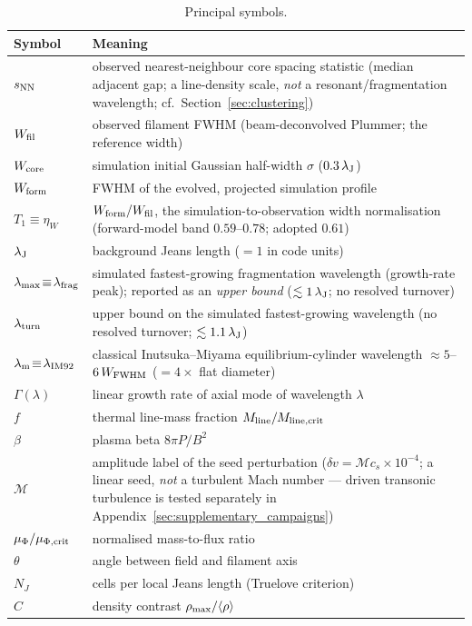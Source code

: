 \documentclass[usenatbib,twoside,twocolumn]{mnras}
\begin{document}
\begin{table}
\caption{Principal symbols.}
\label{tab:symbols}
\footnotesize
\setlength{\tabcolsep}{4pt}
\begin{tabular}{lp{6.1cm}}
\toprule
Symbol & Meaning \\
\midrule
$s_{\rm NN}$ & observed nearest-neighbour core spacing statistic (median adjacent gap; a line-density scale, \emph{not} a resonant/fragmentation wavelength; cf.\ Section~\ref{sec:clustering}) \\
$W_{\rm fil}$ & observed filament FWHM (beam-deconvolved Plummer; the reference width) \\
$W_{\rm core}$ & simulation initial Gaussian half-width $\sigma$ ($0.3\,\lambda_{\rm J}$) \\
$W_{\rm form}$ & FWHM of the evolved, projected simulation profile \\
$T_1\!\equiv\!\eta_W$ & $W_{\rm form}/W_{\rm fil}$, the simulation-to-observation width normalisation (forward-model band $0.59$--$0.78$; adopted $0.61$) \\
$\lambda_{\rm J}$ & background Jeans length ($=1$ in code units) \\
$\lambda_{\rm max}\!\equiv\!\lambda_{\rm frag}$ & simulated fastest-growing fragmentation wavelength (growth-rate peak); reported as an \emph{upper bound} ($\lesssim1\,\lambda_{\rm J}$; no resolved turnover) \\
$\lambda_{\rm turn}$ & upper bound on the simulated fastest-growing wavelength (no resolved turnover; $\lesssim1.1\,\lambda_{\rm J}$) \\
$\lambda_{\rm m}\!\equiv\!\lambda_{\rm IM92}$ & classical Inutsuka--Miyama equilibrium-cylinder wavelength $\approx5$--$6\,W_{\rm FWHM}$ ($=4\times$ flat diameter) \\
$\Gamma(\lambda)$ & linear growth rate of axial mode of wavelength $\lambda$ \\
$f$ & thermal line-mass fraction $M_{\rm line}/M_{\rm line,crit}$ \\
$\beta$ & plasma beta $8\pi P/B^2$ \\
$\mathcal{M}$ & amplitude label of the seed perturbation ($\delta v=\mathcal{M}c_s\times10^{-4}$; a linear seed, \emph{not} a turbulent Mach number --- driven transonic turbulence is tested separately in Appendix~\ref{sec:supplementary_campaigns}) \\
$\mu_\Phi/\mu_{\Phi,\rm crit}$ & normalised mass-to-flux ratio \\
$\theta$ & angle between field and filament axis \\
$N_J$ & cells per local Jeans length (Truelove criterion) \\
$C$ & density contrast $\rho_{\rm max}/\langle\rho\rangle$ \\
\bottomrule
\end{tabular}
\end{table}
\end{document}
